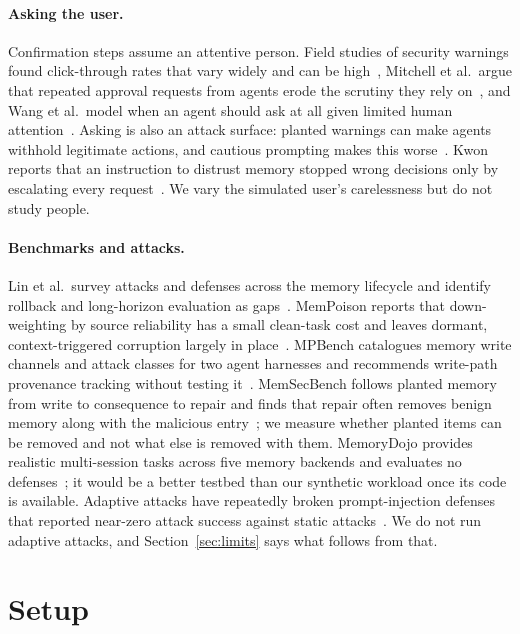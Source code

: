 \documentclass[10pt]{article}
\begin{document}
\paragraph{Asking the user.} Confirmation steps assume an attentive person. Field studies of
security warnings found click-through rates that vary widely and can be high~\cite{warningland},
Mitchell et al.\ argue that repeated approval requests from agents erode the scrutiny they rely
on~\cite{outoftheloop}, and Wang et al.\ model when an agent should ask at all given limited human
attention~\cite{whentoask}. Asking is also an attack surface: planted warnings can make agents
withhold legitimate actions, and cautious prompting makes this worse~\cite{abstentionattack}.
Kwon reports that an instruction to distrust memory stopped wrong decisions only by escalating
every request~\cite{manufacturedconfidence}. We vary the simulated user's carelessness but do not
study people.

\paragraph{Benchmarks and attacks.} Lin et al.\ survey attacks and defenses across the memory
lifecycle and identify rollback and long-horizon evaluation as gaps~\cite{survey}. MemPoison
reports that down-weighting by source reliability has a small clean-task cost and leaves dormant,
context-triggered corruption largely in place~\cite{mempoison}. MPBench catalogues memory write channels and attack classes
for two agent harnesses and recommends write-path provenance tracking without testing
it~\cite{mpbench}. MemSecBench follows planted memory from write to consequence to repair and
finds that repair often removes benign memory along with the malicious entry~\cite{memsecbench};
we measure whether planted items can be removed and not what else is removed with them. MemoryDojo
provides realistic multi-session tasks across five
memory backends and evaluates no defenses~\cite{memorydojo}; it would be a better testbed than our
synthetic workload once its code is available. Adaptive attacks have repeatedly broken
prompt-injection defenses that reported near-zero attack success against static
attacks~\cite{attackermovessecond}. We do not run adaptive attacks, and Section~\ref{sec:limits}
says what follows from that.

\section{Setup}
\end{document}
